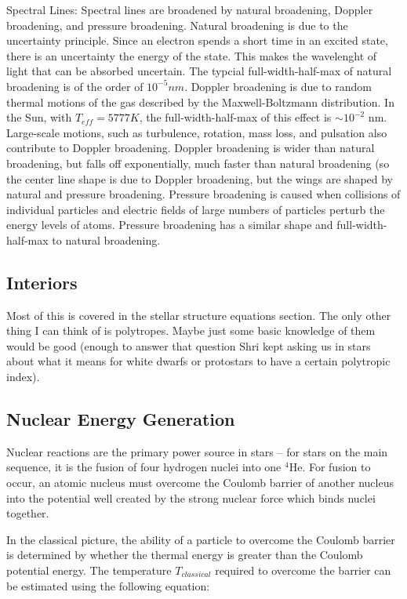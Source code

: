 Spectral Lines:
Spectral lines are broadened by natural broadening, Doppler broadening, and pressure broadening.  
Natural broadening is due to the uncertainty principle.  Since an electron spends a short time 
in an excited state, there is an uncertainty the energy of the state.  This makes the wavelenght 
of light that can be absorbed uncertain.  The typcial full-width-half-max of natural broadening is 
of the order of $10^{-5}nm$.  Doppler broadening is due to random thermal motions of the gas 
described by the Maxwell-Boltzmann distribution.  In the Sun, with $T_{eff}=5777 K$, the 
full-width-half-max of this effect is $\sim 10^{-2}$ nm.  Large-scale motions, such as turbulence, 
rotation, mass loss, and pulsation also contribute to Doppler broadening.  Doppler broadening 
is wider than natural broadening, but falls off exponentially, much faster than natural 
broadening (so the center line shape is due to Doppler broadening, but the wings are shaped by 
natural and pressure broadening.  Pressure broadening is caused when collisions of individual 
particles and electric fields of large numbers of particles perturb the energy levels of atoms.  
Pressure broadening has a similar shape and full-width-half-max to natural broadening.

\subsection{Interiors}
Most of this is covered in the stellar structure equations section.  The only other thing I can
think of is polytropes.  Maybe just some basic knowledge of them would be good (enough to 
answer that question Shri kept asking us in stars about what it means for white dwarfs or 
protostars to have a certain polytropic index).


\subsection{Nuclear Energy Generation}\label{sec:nuclear_reactions}

Nuclear reactions are the primary power source in stars -- for stars on the main sequence, it is the fusion of four hydrogen nuclei into one $^{4}$He.  For fusion to occur, an atomic nucleus must overcome the Coulomb barrier of another nucleus into the potential well created by the strong nuclear force which binds nuclei together.

In the classical picture, the ability of a particle to overcome the Coulomb barrier is determined by whether the thermal energy is greater than the Coulomb potential energy.  The temperature $T_{classical}$ required to overcome the barrier can be estimated using the following equation:

